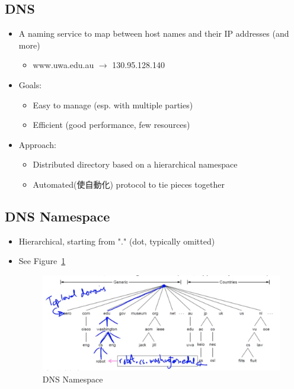 \documentclass[12pt]{ctexart}   %
\begin{document}
	\subsection{DNS}
	\begin{itemize}
		\item A naming service to map between host names and their IP addresses (and more)
		\begin{itemize}
			\item www.uwa.edu.au $\rightarrow$ 130.95.128.140
		\end{itemize}
		
		\item Goals:
		\begin{itemize}
			\item Easy to manage (esp. with multiple parties)
			\item Efficient (good performance, few resources)
		\end{itemize}
		
		\item Approach:
		\begin{itemize}
			\item Distributed directory based on a hierarchical namespace
			\item Automated(使自動化) protocol to tie pieces together
		\end{itemize}
	\end{itemize}
	 
	 
	 \subsection{DNS Namespace}
	 \begin{itemize}
	 	\item Hierarchical, starting from "." (dot, typically omitted)
	 	\item See Figure~\ref{fig:8-2-3}
		  
		 \begin{figure}[h!] %
		\centering
		 \includegraphics[scale=0.7]{images/8-2-3}
		\caption{ DNS Namespace }
		 \label{fig:8-2-3}
		 \end{figure}
	 \end{itemize}
	 
\end{document}
